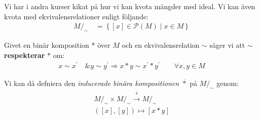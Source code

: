 \noindent Vi har i andra kurser kikat på hur vi kan kvota mängder med ideal. Vi kan även kvota med ekvivalensrelationer enligt följande:
\begin{equation*}
  \begin{gathered}
    M/_\sim\quad = \left\{[x]\in\mathcal{P}(M)\;|\; x\in M\right\}
  \end{gathered}
\end{equation*}
\par\bigskip
\noindent Givet en binär komposition $*$ över $M$ och en ekvivalensrelation $\sim$ säger vi att $\sim$ \textbf{respekterar} $*$ om:
\begin{equation*}
  \begin{gathered}
    x\sim x^{\prime}\quad\& y\sim y^{\prime} \Rightarrow x*y\sim x^{\prime}*y^{\prime}\qquad\forall x,y\in M
  \end{gathered}
\end{equation*}
\par\bigskip
\noindent Vi kan då defniera den \textit{inducerade binära kompositionen} $\overline{*}$ på $M/_\sim$ genom:
\begin{equation*}
  \begin{gathered}
    M/_\sim\times M/_\sim\stackrel{\overline{*}}{\to} M/_\sim\\
    \left([x],[y]\right)\mapsto [x*y]
  \end{gathered}
\end{equation*}
\par\bigskip
